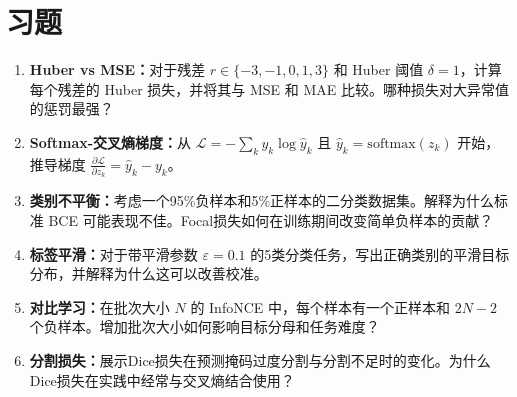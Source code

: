 \section{习题}

\begin{enumerate}
    \item \textbf{Huber vs MSE：}对于残差 $r \in \{-3, -1, 0, 1, 3\}$ 和 Huber 阈值 $\delta = 1$，计算每个残差的 Huber 损失，并将其与 MSE 和 MAE 比较。哪种损失对大异常值的惩罚最强？

    \item \textbf{Softmax-交叉熵梯度：}从 $\mathcal{L} = -\sum_k y_k \log \hat{y}_k$ 且 $\hat{y}_k = \text{softmax}(z_k)$ 开始，推导梯度 $\frac{\partial \mathcal{L}}{\partial z_k} = \hat{y}_k - y_k$。

    \item \textbf{类别不平衡：}考虑一个95\%负样本和5\%正样本的二分类数据集。解释为什么标准 BCE 可能表现不佳。Focal损失如何在训练期间改变简单负样本的贡献？

    \item \textbf{标签平滑：}对于带平滑参数 $\varepsilon = 0.1$ 的5类分类任务，写出正确类别的平滑目标分布，并解释为什么这可以改善校准。

    \item \textbf{对比学习：}在批次大小 $N$ 的 InfoNCE 中，每个样本有一个正样本和 $2N-2$ 个负样本。增加批次大小如何影响目标分母和任务难度？

    \item \textbf{分割损失：}展示Dice损失在预测掩码过度分割与分割不足时的变化。为什么Dice损失在实践中经常与交叉熵结合使用？
\end{enumerate}
